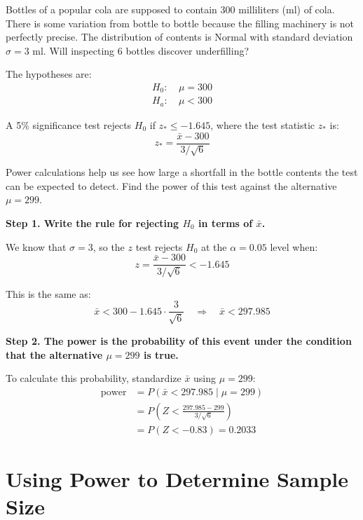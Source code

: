 \begin{example}


Bottles of a popular cola are supposed to contain 300 milliliters (ml) of cola. There is some variation from bottle to bottle because the filling machinery is not perfectly precise. The distribution of contents is Normal with standard deviation $\sigma = 3$ ml. Will inspecting 6 bottles discover underfilling?

The hypotheses are:
\begin{align*}
H_0\!:&\ \mu = 300 \\
H_a\!:&\ \mu < 300
\end{align*}

A 5\% significance test rejects $H_0$ if $z_* \leq -1.645$, where the test statistic $z_*$ is:
\[
z_* = \frac{\bar{x} - 300}{3 / \sqrt{6}}
\]

Power calculations help us see how large a shortfall in the bottle contents the test can be expected to detect. Find the power of this test against the alternative $\mu = 299$.

\vspace{1em}
\textbf{Step 1. Write the rule for rejecting $H_0$ in terms of $\bar{x}$.}

We know that $\sigma = 3$, so the $z$ test rejects $H_0$ at the $\alpha = 0.05$ level when:
\[
z = \frac{\bar{x} - 300}{3 / \sqrt{6}} < -1.645
\]

This is the same as:
\[
\bar{x} < 300 - 1.645 \cdot \frac{3}{\sqrt{6}} \quad \Rightarrow \quad \bar{x} < 297.985
\]

\vspace{1em}
\textbf{Step 2. The power is the probability of this event under the condition that the alternative $\mu = 299$ is true.}

To calculate this probability, standardize $\bar{x}$ using $\mu = 299$:
\[
\begin{aligned}
\text{power} &= P(\bar{x} < 297.985 \mid \mu = 299) \\
&= P\left( Z < \frac{297.985 - 299}{3 / \sqrt{6}} \right) \\
&= P(Z < -0.83) = 0.2033
\end{aligned}
\]

\end{example}
\section{Using Power to Determine Sample Size}




